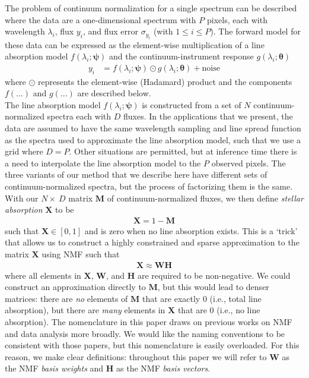 \documentclass[modern]{aastex631}
\renewcommand{\vec}[1]{\mathbf{#1}}
\newcommand{\vectheta}{\boldsymbol{\theta}}
\newcommand{\vecpsi}{\boldsymbol{\psi}}
\newcommand{\vecW}{\mathbf{W}}
\newcommand{\vecH}{\mathbf{H}}
\newcommand{\vecX}{\mathbf{X}}
\newcommand{\hadamard}{\odot}
\begin{document}

The problem of continuum normalization for a single spectrum can be described where the data are a one-dimensional spectrum with $P$ pixels, each with wavelength $\lambda_i$, flux $y_i$, and flux error $\sigma_{y_i}$ (with $1 \leq i \leq P$). The forward model for these data can be expressed as the element-wise multiplication of a line absorption model $f(\lambda_i; \vecpsi)$ and the continuum-instrument response $g(\lambda_i;\vectheta)$
\begin{align}
    y_i &= f(\lambda_i;\vecpsi)\hadamard{}g(\lambda_i;\vectheta) + \mbox{noise}
\end{align}
where $\hadamard$ represents the element-wise (Hadamard) product and the components $f(...)$ and $g(...)$ are described below.\\


The line absorption model $f(\lambda_i;\vecpsi)$ is constructed from a set of $N$ continuum-normalized spectra each with $D$ fluxes. In the applications that we present, the data are assumed to have the same wavelength sampling and line spread function as the spectra used to approximate the line absorption model, such that we use a grid where $D = P$. Other situations are permitted, but at inference time there is a need to interpolate the line absorption model to the $P$ observed pixels. The three variants of our method that we describe here have different sets of continuum-normalized spectra, but the process of factorizing them is the same. With our $N \times\ D$ matrix $\vec{M}$ of continuum-normalized fluxes, we then define \emph{stellar absorption} $\vecX$ to be
\begin{align}
    \vecX = 1 - \vec{M}
\end{align}
such that $\vecX \in \left[0, 1\right]$ and is zero when no line absorption exists. This is a `trick' that allows us to construct a highly constrained and sparse approximation to the matrix $\vecX$ using NMF such that 
\begin{align}
    \vecX \approx \vec{W}\vec{H} \label{eq:nmf}
\end{align}
where all elements in $\vecX$, $\vec{W}$, and $\vec{H}$ are required to be non-negative. 
We could construct an approximation directly to $\vec{M}$, but this would lead to denser matrices: there are \emph{no} elements of $\vec{M}$ that are exactly 0 (i.e., total line absorption), but there are \emph{many} elements in $\vecX$ that are 0 (i.e., no line absorption). The nomenclature in this paper draws on previous works on NMF and data analysis more broadly. We would like the naming conventions to be consistent with those papers, but this nomenclature is easily overloaded. For this reason, we make clear definitions: throughout this paper we will refer to $\vecW$ as the NMF \emph{basis weights} and $\vecH$ as the NMF \emph{basis vectors}. \\
\end{document}
